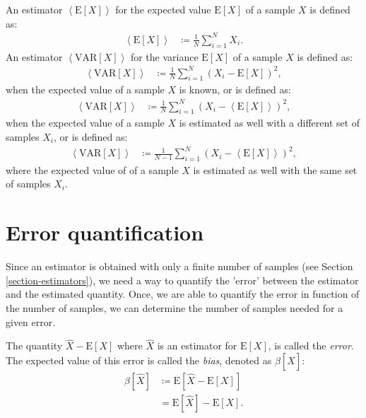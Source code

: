 \documentclass[10pt,a4paper]{article}
\numberwithin{equation}{section}
\begin{document}
An estimator $\left<\mathrm{E}\left[X\right]\right>$ for the expected value $\mathrm{E}\left[X\right]$ of a sample $X$ is defined as:
\begin{align}
\label{equation:estE}\left<\mathrm{E}\left[X\right]\right> &\coloneqq \frac{1}{N} \sum_{i=1}^{N} X_{i}.
\end{align}
An estimator $\left<\mathrm{VAR}\left[X\right]\right>$ for the variance $\mathrm{E}\left[X\right]$ of a sample $X$ is defined as:
\begin{align}
\label{equation:estVAR1}\left<\mathrm{VAR}\left[X\right]\right> &\coloneqq \frac{1}{N} \sum_{i=1}^{N} {\left(X_{i} - \mathrm{E}[X]\right)}^{2},
\end{align}
when the expected value of a sample $X$ is known, or is defined as:
\begin{align}
\label{equation:estVAR2}\left<\mathrm{VAR}\left[X\right]\right> &\coloneqq \frac{1}{N} \sum_{i=1}^{N} {\left(X_{i} - \left<\mathrm{E}\left[X\right]\right>\right)}^{2},
\end{align}
when the expected value of a sample $X$ is estimated as well with a different set of samples $X_{i}$, or is defined as:
\begin{align}
\label{equation:estVAR}\left<\mathrm{VAR}\left[X\right]\right> &\coloneqq \frac{1}{N-1} \sum_{i=1}^{N} {\left(X_{i} - \left<\mathrm{E}\left[X\right]\right>\right)}^{2},
\end{align}
where the expected value of of a sample $X$ is estimated as well with the same set of samples $X_{i}$.

\section{Error quantification}
Since an estimator is obtained with only a finite number of samples (see Section \ref{section-estimators}), we need a way to quantify the 'error' between the estimator and the estimated quantity. Once, we are able to quantify the error in function of the number of samples, we can determine the number of samples needed for a given error.

The quantity $\widehat{X} - \mathrm{E}\left[X\right]$ where $\widehat{X}$ is an estimator for $\mathrm{E}\left[X\right]$, is called the \textit{error}. The expected value of this error is called the \textit{bias}, denoted as $\beta\left[\widehat{X}\right]$:
\begin{align}
\beta\left[\widehat{X}\right] &\coloneqq \mathrm{E}\left[\widehat{X} - \mathrm{E}\left[X\right]\right] \\
&= \mathrm{E}\left[\widehat{X}\right] - \mathrm{E}\left[X\right]. \nonumber
\end{align}
\end{document}

